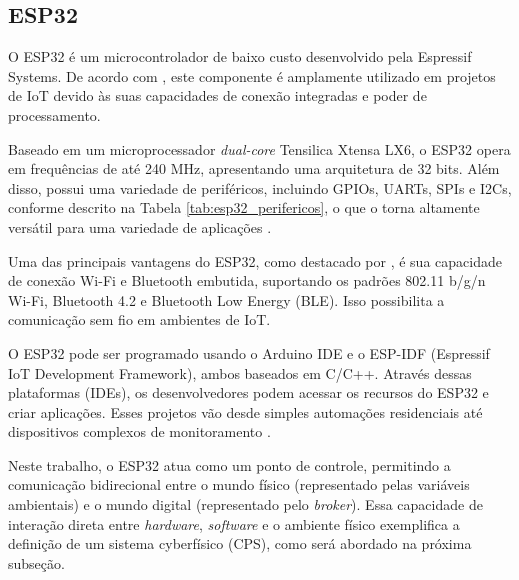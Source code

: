 \subsection{ESP32}

O ESP32 é um microcontrolador de baixo custo desenvolvido pela Espressif Systems. De acordo com \textcite{ESP32_usage}, este componente é amplamente utilizado em projetos de IoT devido às suas capacidades de conexão integradas e poder de processamento.

Baseado em um microprocessador \textit{dual-core} Tensilica Xtensa LX6, o ESP32 opera em frequências de até 240 MHz, apresentando uma arquitetura de 32 bits. Além disso, possui uma variedade de periféricos, incluindo GPIOs, UARTs, SPIs e I2Cs, conforme descrito na Tabela \ref{tab:esp32_perifericos}, o que o torna altamente versátil para uma variedade de aplicações \parencite{EspressifESP32}.

Uma das principais vantagens do ESP32, como destacado por \textcite{ESP32_usage}, é sua capacidade de conexão Wi-Fi e Bluetooth embutida, suportando os padrões 802.11 b/g/n Wi-Fi, Bluetooth 4.2 e Bluetooth Low Energy (BLE). Isso possibilita a comunicação sem fio em ambientes de IoT.

O ESP32 pode ser programado usando o Arduino IDE e o ESP-IDF (Espressif IoT Development Framework), ambos baseados em C/C++. Através dessas plataformas (IDEs), os desenvolvedores podem acessar os recursos do ESP32 e criar aplicações. Esses projetos vão desde simples automações residenciais até dispositivos complexos de monitoramento \parencite{ferrandez2018precision, junior2022data, hsu2020creative}.

Neste trabalho, o ESP32 atua como um ponto de controle, permitindo a comunicação bidirecional entre o mundo físico (representado pelas variáveis ambientais) e o mundo digital (representado pelo \textit{broker}). Essa capacidade de interação direta entre \textit{hardware}, \textit{software} e o ambiente físico exemplifica a definição de um sistema cyberfísico (CPS), como será abordado na próxima subseção.

